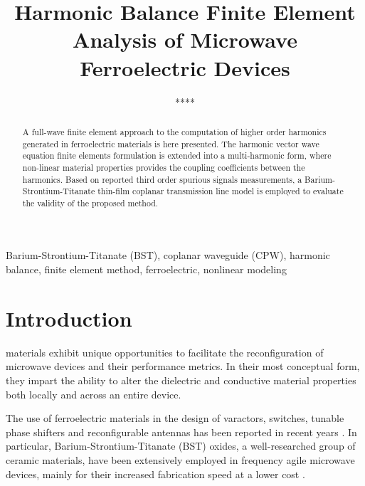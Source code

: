 \documentclass[journal,twoside,letterpaper]{IEEEtran}
\begin{document}
\title{Harmonic Balance Finite Element Analysis of Microwave Ferroelectric Devices}
\author{****
}


\maketitle

\begin{abstract}
A full-wave finite element approach to the computation of higher order harmonics generated in ferroelectric materials is here presented. The harmonic vector wave equation finite elements formulation is extended into a multi-harmonic form, where non-linear material properties provides the coupling coefficients between the harmonics. Based on reported third order spurious signals measurements, a Barium-Strontium-Titanate thin-film coplanar transmission line model is employed to evaluate the validity of the proposed method.
\end{abstract}

\begin{IEEEkeywords}
Barium-Strontium-Titanate (BST), coplanar waveguide (CPW), harmonic balance, finite element method, ferroelectric, nonlinear modeling
\end{IEEEkeywords}

\IEEEpeerreviewmaketitle

\section{Introduction}

 materials exhibit unique opportunities to facilitate the reconfiguration of microwave devices and their performance metrics. In their most conceptual form, they impart the ability to alter the dielectric and conductive material properties both locally and across an entire device.

The use of ferroelectric materials in the design of varactors, switches, tunable phase shifters and reconfigurable antennas has been reported in recent years \cite{Kong2012, wang2005high, Sazegar2011, li2015cpw, Mansour2016, He2019}. In particular, Barium-Strontium-Titanate (BST) oxides, a well-researched group of ceramic materials, have been extensively employed in frequency agile microwave devices, mainly for their increased fabrication speed at a lower cost \cite{furlan2015influence}.
\end{document}
